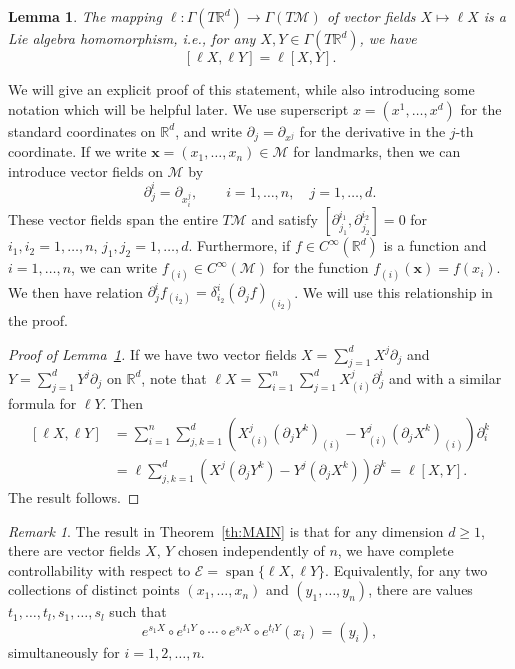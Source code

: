 \documentclass[10pt]{amsart}
\newcounter{dummy} \numberwithin{dummy}{section}
\newtheorem{lemma}[dummy]{Lemma}
\theoremstyle{remark}
\newtheorem{remark}[dummy]{Remark}
\DeclareMathOperator{\spn}{span}
\newcommand{\E}{\mathcal{E}}
\newcommand{\LM}{\mathcal{M}}
\numberwithin{equation}{section}
\begin{document}
\begin{lemma}  \label{lemma:LieAlgHom}
The mapping $\ell: \Gamma(T\mathbb{R}^d) \to \Gamma(T\LM)$ of vector fields $X \mapsto \ell X$ is a Lie algebra homomorphism, i.e., for any $X, Y \in \Gamma(T\mathbb{R}^d)$, we have
$$[\ell X, \ell Y] = \ell [X, Y].$$
\end{lemma}
We will give an explicit proof of this statement, while also introducing some notation which will be helpful later. We use superscript $x = (x^1, \dots, x^d)$ for the standard coordinates on $\mathbb{R}^d$, and write $\partial_j = \partial_{x^j}$ for the derivative in the $j$-th coordinate. If we write $\mathbf{x} =(x_1, \dots, x_n) \in \LM$ for landmarks, then we can introduce vector fields on $\LM$ by
\begin{equation} \label{partialij} \partial^i_{j} = \partial_{x^j_i}, \qquad i=1, \dots, n, \quad j=1, \dots,d. \end{equation}
These vector fields span the entire $T\LM$ and satisfy $[\partial^{i_1}_{j_1}, \partial^{i_2}_{j_2}] =0$ for $i_1,i_2=1, \dots, n$, $j_1, j_2 = 1,\dots, d$. Furthermore, if $f \in C^\infty(\mathbb{R}^d)$ is a function and $i =1, \dots, n$, we can write $f_{(i)} \in C^\infty(\LM)$ for the function $f_{(i)}(\mathbf{x}) = f(x_i)$. We then have relation $\partial_{j}^i f_{(i_2)} = \delta_{i_2}^i (\partial_j f)_{(i_2)}$. We will use this relationship in the proof.

\begin{proof}[Proof of Lemma~\ref{lemma:LieAlgHom}]
If we have two vector fields $X = \sum_{j=1}^d X^j \partial_j$ and $Y = \sum_{j=1}^d Y^j \partial_j$ on $\mathbb{R}^d$, note that $\ell X = \sum_{i=1}^n \sum_{j=1}^d X^j_{(i)} \partial^i_{j}$ and with a similar formula for $\ell Y$. Then
\begin{align}
{[\ell X,\ell Y]} & = \sum_{i=1}^n \sum_{j,k=1}^d \left( X^j_{(i)} (\partial_{j}  Y^k)_{(i)} - Y^j_{(i)} (\partial_{j}  X^k)_{(i)} \right) \partial^k_{i} \\
&= \ell \sum_{j,k=1}^d \left( X^j (\partial_{j}  Y^k) - Y^j (\partial_{j}  X^k) \right) \partial^k = \ell [X, Y].
\end{align}
The result follows.
\end{proof}

\begin{remark}
The result in Theorem~\ref{th:MAIN} is that for any dimension $d \geq 1$, there are vector fields $X$, $Y$ chosen independently of $n$, we have complete controllability with respect to $\E = \spn\{\ell X, \ell Y\}$. Equivalently, for any two collections of distinct points $(x_1, \dots, x_n)$ and $(y_1, \dots, y_n)$, there are values $t_1, \dots, t_l, s_1,\dots, s_l$ such that
$$e^{s_1 X} \circ e^{t_1 Y} \circ \cdots \circ e^{s_l X} \circ e^{t_l Y}(x_i) = (y_i), $$
simultaneously for $i=1,2, \dots, n.$
\end{remark}
\end{document}
